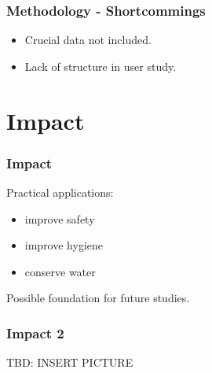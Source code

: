\documentclass{beamer}
\begin{document}
\begin{frame}
	\frametitle{Methodology - Shortcommings}
	\begin{itemize}
	  \item Crucial data not included.
	  \item Lack of structure in user study.
        \end{itemize}          


\end{frame}


\section{Impact}
\begin{frame}
	\frametitle{Impact}
        Practical applications:
	\begin{itemize}
	  \item improve safety
          \item improve hygiene
          \item conserve water
        \end{itemize} 
        Possible foundation for future studies.
\end{frame}

\begin{frame}
	\frametitle{Impact 2}
        TBD: INSERT PICTURE
        
\end{frame}





	
\end{document}
